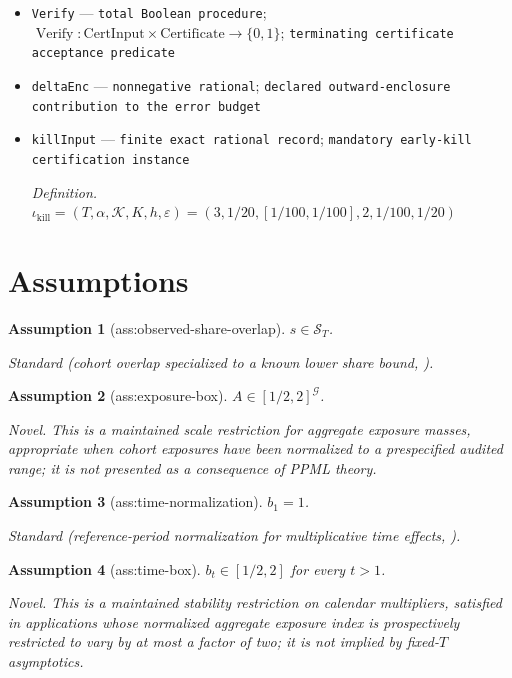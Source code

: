 \documentclass{article}
\newtheorem{assumption}{Assumption}
\begin{document}
\begin{itemize}
  \item \texttt{Verify} --- \texttt{total Boolean procedure}; \(\operatorname{Verify}:\mathrm{CertInput}\times\mathrm{Certificate}\to\{0,1\}\); \texttt{terminating certificate acceptance predicate}
  \item \texttt{deltaEnc} --- \texttt{nonnegative rational}; \texttt{declared outward-\allowbreak{}enclosure contribution to the error budget}
  \item \texttt{killInput} --- \texttt{finite exact rational record}; \texttt{mandatory early-\allowbreak{}kill certification instance}
  \par\smallskip\noindent\emph{Definition.} \(\iota_{\mathrm{kill}}=(T,\alpha,\mathcal K,K,h,\varepsilon)=(3,1/20,[1/100,1/100],2,1/100,1/20)\)
\end{itemize}

\section{Assumptions}

\begin{assumption}[ass:observed-share-overlap]\label{ass:observed-share-overlap}
\(s\in\mathcal S_T\).
\par\smallskip\noindent\emph{Standard} (cohort overlap specialized to a known lower share bound, \cite{CallawaySantAnna2021}).
\end{assumption}

\begin{assumption}[ass:exposure-box]\label{ass:exposure-box}
\(A\in[1/2,2]^{\mathcal G}\).
\par\smallskip\noindent\emph{Novel.} This is a maintained scale restriction for aggregate exposure masses, appropriate when cohort exposures have been normalized to a prespecified audited range; it is not presented as a consequence of PPML theory.
\end{assumption}

\begin{assumption}[ass:time-normalization]\label{ass:time-normalization}
\(b_1=1\).
\par\smallskip\noindent\emph{Standard} (reference-period normalization for multiplicative time effects, \cite{Wooldridge2023NonlinearDiD}).
\end{assumption}

\begin{assumption}[ass:time-box]\label{ass:time-box}
\(b_t\in[1/2,2]\) for every \(t>1\).
\par\smallskip\noindent\emph{Novel.} This is a maintained stability restriction on calendar multipliers, satisfied in applications whose normalized aggregate exposure index is prospectively restricted to vary by at most a factor of two; it is not implied by fixed-\(T\) asymptotics.
\end{assumption}
\end{document}
